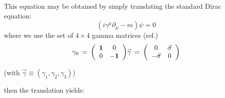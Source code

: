 \vspace*{11mm}


This equation may be obtained by simply translating the standard Dirac
equation:
\begin{equation}
(i \gamma^{\mu} \partial_{\mu} - m ) \psi  = 0
\end{equation}
where we use the set of $4 \times 4$ gamma matrices (ref.\cite{zub})
\begin{eqnarray*}
\gamma_{0} \: = \: \left( \begin{array}{cc} {\bf 1} & 0\\
0 & {\bf -1} \end{array} \right) & \vec{\gamma} \: = \: \left(
\begin{array}{cc}
0 & \vec{\sigma}\\ -\vec{\sigma} & 0 \end{array} \right) \\
\end{eqnarray*}
\begin{center}
(with $\vec{\gamma} \equiv (\gamma_{1},\gamma_{2},\gamma_{3})$)
\end{center}
then the translation yields:
